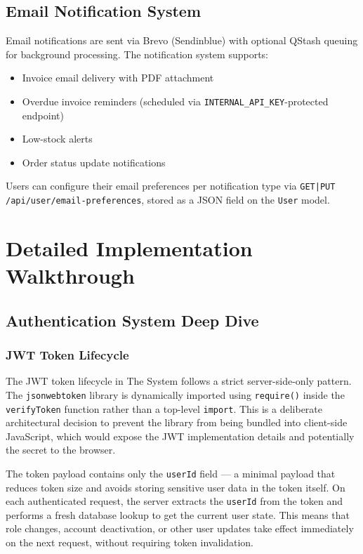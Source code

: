 \documentclass[12pt,a4paper]{report}
\begin{document}
\section{Email Notification System}

Email notifications are sent via Brevo (Sendinblue) with optional QStash queuing for background processing. The notification system supports:
\begin{itemize}[leftmargin=1.5em]
  \item Invoice email delivery with PDF attachment
  \item Overdue invoice reminders (scheduled via \texttt{INTERNAL\_API\_KEY}-protected endpoint)
  \item Low-stock alerts
  \item Order status update notifications
\end{itemize}

Users can configure their email preferences per notification type via \texttt{GET|PUT /api/user/email-preferences}, stored as a JSON field on the \texttt{User} model.


\chapter{Detailed Implementation Walkthrough}
\section{Authentication System Deep Dive}

\subsection{JWT Token Lifecycle}

The JWT token lifecycle in The System follows a strict server-side-only pattern. The \texttt{jsonwebtoken} library is dynamically imported using \texttt{require()} inside the \texttt{verifyToken} function rather than a top-level \texttt{import}. This is a deliberate architectural decision to prevent the library from being bundled into client-side JavaScript, which would expose the JWT implementation details and potentially the secret to the browser.

The token payload contains only the \texttt{userId} field --- a minimal payload that reduces token size and avoids storing sensitive user data in the token itself. On each authenticated request, the server extracts the \texttt{userId} from the token and performs a fresh database lookup to get the current user state. This means that role changes, account deactivation, or other user updates take effect immediately on the next request, without requiring token invalidation.
\end{document}
